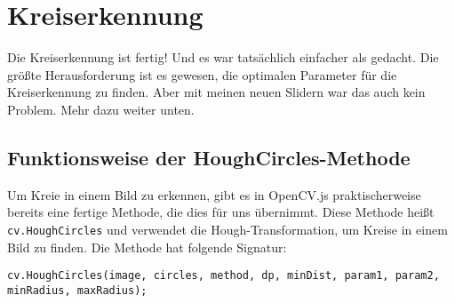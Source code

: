 \section{Kreiserkennung}
Die Kreiserkennung ist fertig! Und es war tatsächlich einfacher als gedacht. Die größte Herausforderung ist es gewesen, die optimalen Parameter für die Kreiserkennung zu finden. Aber mit meinen neuen Slidern war das auch kein Problem. Mehr dazu weiter unten.

\subsection{Funktionsweise der HoughCircles-Methode}
Um Kreie in einem Bild zu erkennen, gibt es in OpenCV.js praktischerweise bereits eine fertige Methode, die dies für uns übernimmt. Diese Methode heißt \texttt{cv.HoughCircles} und verwendet die Hough-Transformation, um Kreise in einem Bild zu finden. Die Methode hat folgende Signatur:

\begin{lstlisting}[style=JavaScript]
cv.HoughCircles(image, circles, method, dp, minDist, param1, param2, minRadius, maxRadius);
\end{lstlisting}

